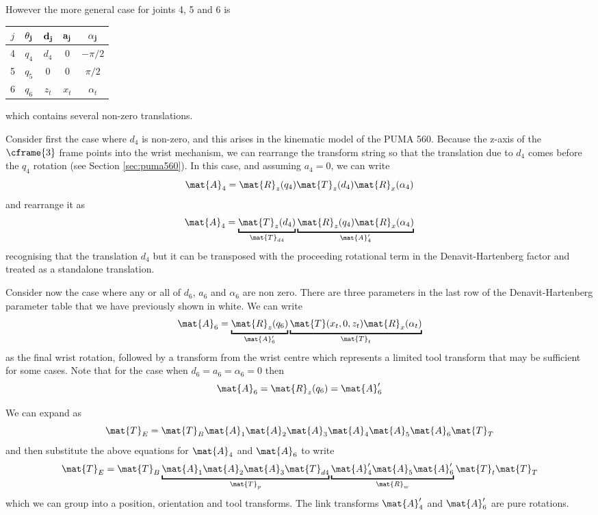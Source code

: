 \documentclass[11pt]{article}
\numberwithin{equation}{section}
\begin{document}
However the more general case for joints 4, 5 and 6 is
\begin{center}
\begin{tabular}{|c|c|c|c|c|} \hline
$j$ & $\bf \theta_j$ & $\bf d_j$ & $\bf a_j$ & $\bf \alpha_j$ \\ \hline
\rowcolor{Peach}4 &  $q_4$ & \cellcolor{white} $d_4$  & 0 & $-\pi/2$ \\
\rowcolor{Peach}5 &$q_5$ & 0 & 0 & $\pi/2$ \\
\cellcolor{Peach} 6 & \cellcolor{Peach} $q_6$ & $z_t$ & $x_t$ & $\alpha_t$  \\ \hline
\end{tabular}
\end{center}
which contains several non-zero translations.

Consider first the case where $d_4$ is non-zero, and this arises in the kinematic model of the PUMA 560.  Because the z-axis of the $\cframe{3}$ frame points into the wrist mechanism, we can rearrange the
transform string so that the translation due to $d_4$ comes before the $q_4$ rotation (see Section \ref{sec:puma560}).  In this case, and assuming $a_4=0$,
we can write
\[
\mat{A}_4 = \mat{R}_z(q_4) \mat{T}_z(d_4) \mat{R}_x(\alpha_4) 
\]
 and rearrange it as
\[
\mat{A}_4 =  \underbracket{\mat{T}_z(d_4)}_{\mat{T}_{d4}} \underbracket{\mat{R}_z(q_4)  \mat{R}_x(\alpha_4)}_{\mat{A}_4^\prime} 
\]
recognising that the translation $d_4$ but it can be transposed with the proceeding rotational term in the Denavit-Hartenberg
factor and treated as a standalone translation.

Consider now the case where any or all of $d_6$, $a_6$ and $\alpha_6$ are non zero.
There are three parameters in the last row of the Denavit-Hartenberg parameter table that we have previously shown in white.
We can write
\[
\mat{A}_6 = \underbracket{\mat{R}_z(q_6)}_{\mat{A}_6^\prime}  \underbracket{\mat{T}(x_t, 0, z_t) \mat{R}_x(\alpha_t)}_{\mat{T}_t}
\]
as the final wrist rotation, followed by a transform from the wrist centre which represents a limited tool transform that may be sufficient for some cases.
Note that for the case when $d_6=a_6=\alpha_6=0$ then
\[
\mat{A}_6 = \mat{R}_z(q_6) = \mat{A}_6^\prime
\]

We can expand   as
\[
\mat{T}_E = \mat{T}_B \mat{A}_1 \mat{A}_2 \mat{A}_3 \mat{A}_4 \mat{A}_5 \mat{A}_6 \mat{T}_T 
\]
and then substitute the above equations for $\mat{A}_4$ and $\mat{A}_6$ to write
\begin{equation}
\mat{T}_E = \mat{T}_B \underbracket{\mat{A}_1 \mat{A}_2 \mat{A}_3 \mat{T}_{d4}}_{\mat{T}_p}  \underbracket{\mat{A}_4^\prime \mat{A}_5 \mat{A}_6^\prime}_{\mat{R}_w} \mat{T}_t \mat{T}_T \label{eq:overall}  
\end{equation}
which we can group into a position, orientation and tool transforms.
The link transforms $\mat{A}_4^\prime$ and $\mat{A}_6^\prime$ are pure rotations.
\end{document}
